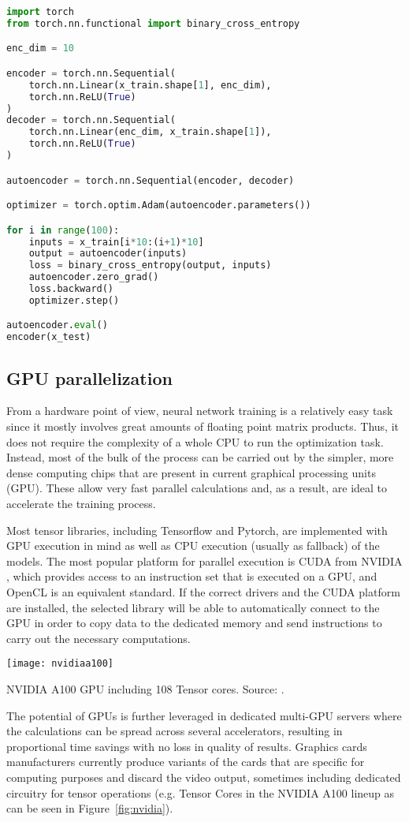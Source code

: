 \begin{lstlisting}[language=Python]
import torch
from torch.nn.functional import binary_cross_entropy

enc_dim = 10

encoder = torch.nn.Sequential(
    torch.nn.Linear(x_train.shape[1], enc_dim),
    torch.nn.ReLU(True)
)
decoder = torch.nn.Sequential(
    torch.nn.Linear(enc_dim, x_train.shape[1]),
    torch.nn.ReLU(True)
)

autoencoder = torch.nn.Sequential(encoder, decoder)

optimizer = torch.optim.Adam(autoencoder.parameters())

for i in range(100):
    inputs = x_train[i*10:(i+1)*10]
    output = autoencoder(inputs)
    loss = binary_cross_entropy(output, inputs)
    autoencoder.zero_grad()
    loss.backward()
    optimizer.step()

autoencoder.eval()
encoder(x_test)
\end{lstlisting}


\subsection{GPU parallelization}

From a hardware point of view, neural network training is a relatively easy task since it mostly involves great amounts of floating point matrix products. Thus, it does not require the complexity of a whole CPU to run the optimization task. Instead, most of the bulk of the process can be carried out by the simpler, more dense computing chips that are present in current graphical processing units (GPU). These allow very fast parallel calculations and, as a result, are ideal to accelerate the training process.

Most tensor libraries, including Tensorflow and Pytorch, are implemented with GPU execution in mind as well as CPU execution (usually as fallback) of the models. The most popular platform for parallel execution is CUDA from NVIDIA , which provides access to an instruction set that is executed on a GPU, and OpenCL  is an equivalent standard. If the correct drivers and the CUDA platform are installed, the selected library will be able to automatically connect to the GPU in order to copy data to the dedicated memory and send instructions to carry out the necessary computations.

\begin{marginfigure}
    \texttt{[image: nvidiaa100]}
    \caption[NVIDIA A100 GPU including 108 Tensor cores.]{\label{fig:nvidia}NVIDIA A100 GPU including 108 Tensor cores. Source: \cite{nvidiaa100}.}
\end{marginfigure}
 
The potential of GPUs is further leveraged in dedicated multi-GPU servers where the calculations can be spread across several accelerators, resulting in proportional time savings with no loss in quality of results. Graphics cards manufacturers currently produce variants of the cards that are specific for computing purposes and discard the video output, sometimes including dedicated circuitry for tensor operations (e.g. Tensor Cores in the NVIDIA A100 lineup  as can be seen in Figure~\ref{fig:nvidia}).

